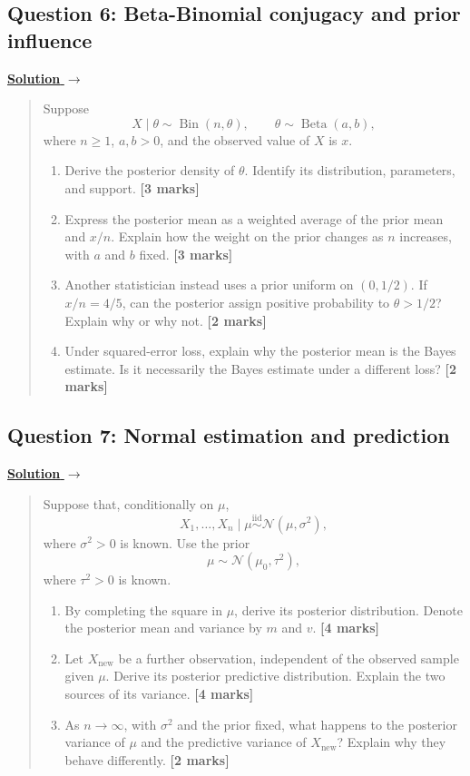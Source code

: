 \documentclass[11pt,a4paper]{article}
\newcommand{\given}{\mathrel{|}}
\newenvironment{examquestion}[2]
  {\subsection{#1}\label{question:\arabic{subsection}}\label{#2}%
   \noindent\hyperref[answer:\arabic{subsection}]{\textbf{Solution} $\rightarrow$}%
   \begin{quote}\color{statgrey}}
  {\end{quote}}
\begin{document}
\clearpage

\begin{examquestion}{Question 6: Beta-Binomial conjugacy and prior influence}{question:practice-beta-binomial-conjugacy-and-prior-influence}
Suppose
\[
  X\given\theta\sim\operatorname{Bin}(n,\theta),
  \qquad
  \theta\sim\operatorname{Beta}(a,b),
\]
where $n\geq1$, $a,b>0$, and the observed value of $X$ is $x$.

\begin{enumerate}[label=(\alph*)]
  \item Derive the posterior density of $\theta$. Identify its distribution,
        parameters, and support. \textbf{[3 marks]}

  \item Express the posterior mean as a weighted average of the prior mean
        and $x/n$. Explain how the weight on the prior changes as $n$
        increases, with $a$ and $b$ fixed. \textbf{[3 marks]}

  \item Another statistician instead uses a prior uniform on $(0,1/2)$. If
        $x/n=4/5$, can the posterior assign positive probability to
        $\theta>1/2$? Explain why or why not. \textbf{[2 marks]}

  \item Under squared-error loss, explain why the posterior mean is the Bayes
        estimate. Is it necessarily the Bayes estimate under a different
        loss? \textbf{[2 marks]}
\end{enumerate}
\end{examquestion}

\clearpage

\begin{examquestion}{Question 7: Normal estimation and prediction}{question:practice-normal-estimation-and-prediction}
Suppose that, conditionally on $\mu$,
\[
  X_1,\ldots,X_n\given\mu
  \overset{\mathrm{iid}}{\sim}\mathcal{N}(\mu,\sigma^2),
\]
where $\sigma^2>0$ is known. Use the prior
\[
  \mu\sim\mathcal{N}(\mu_0,\tau^2),
\]
where $\tau^2>0$ is known.

\begin{enumerate}[label=(\alph*)]
  \item By completing the square in $\mu$, derive its posterior
        distribution. Denote the posterior mean and variance by $m$ and $v$.
        \textbf{[4 marks]}

  \item Let $X_{\mathrm{new}}$ be a further observation, independent of the
        observed sample given $\mu$. Derive its posterior predictive
        distribution. Explain the two sources of its variance.
        \textbf{[4 marks]}

  \item As $n\to\infty$, with $\sigma^2$ and the prior fixed, what happens
        to the posterior variance of $\mu$ and the predictive variance of
        $X_{\mathrm{new}}$? Explain why they behave differently.
        \textbf{[2 marks]}
\end{enumerate}
\end{examquestion}
\end{document}
